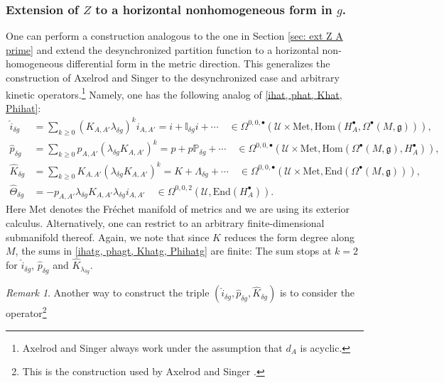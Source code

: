 \documentclass[11pt,a4paper]{amsart}
\theoremstyle{plain} %
\theoremstyle{definition}
\theoremstyle{remark}
\newtheorem{rem}[thm]{Remark}
\newcommand{\g}{\mathfrak{g}}
\newcommand{\mr}{\mathrm}
\newcommand{\bt}{\bullet}
\newcommand{\wh}{\widehat}
\newcommand{\mc}{\mathcal}
\begin{document}
{\subsubsection{Extension of $Z$ to a horizontal nonhomogeneous form in $g$.}
\label{sss Zhat g}
One can perform a construction analogous to the one in Section \ref{sec: ext Z A prime} and extend the desynchronized partition function to a horizontal non-homogeneous differential form in the metric direction. This generalizes the construction of Axelrod and Singer \cite{Axelrod1994} to the desynchronized case and arbitrary kinetic operators.\footnote{Axelrod and Singer always work under the assumption that $d_A$ is acyclic.} Namely, one has the following analog of \eqref{ihat, phat, Khat, Phihat}: 
\begin{equation}\label{ihatg, phagt, Khatg, Phihatg}
\begin{aligned}
    \wh{i}_{\delta g}&=\sum_{k\geq 0} (K_{A,A'}\lambda_{\delta g})^k i_{A,A'}=i+\mathbb{I}_{\delta g}i+\cdots \quad \in \Omega^{0,0,\bt}(\mc{U}\times \mr{Met},\mr{Hom}(H_A^\bt,\Omega^\bt(M,\g))), \\
    \wh{p}_{\delta g}&= \sum_{k\geq 0} p_{A,A'}(\lambda_{\delta g} K_{A,A'})^k=p+p\mathbb{P}_{\delta g}+\cdots\quad \in \Omega^{0,0,\bt}(\mc{U}\times \mr{Met},\mr{Hom}(\Omega^\bt(M,\g),H_A^\bt)), \\
     \wh{K}_{\delta g}&= \sum_{k\geq 0} K_{A,A'}(\lambda_{\delta g} K_{A,A'})^k=K+\Lambda_{\delta g}+\cdots\quad \in \Omega^{0,0,\bt}(\mc{U}\times \mr{Met},\mr{End}(\Omega^\bt(M,\g))),\\
     \wh\Theta_{\delta g}&=-p_{A,A'}\lambda_{\delta g} K_{A,A'}\lambda_{\delta g} i_{A,A'}\quad  \in \Omega^{0,0,2}(\mc{U},\mr{End}(H^\bt_A)).
\end{aligned}
\end{equation}
Here $\mr{Met}$ denotes the Fr\'echet manifold of metrics and we are using its exterior calculus. Alternatively, one can restrict to an arbitrary finite-dimensional submanifold thereof.
Again, we note that since $K$ reduces the form degree along $M$, the sums in \eqref{ihatg, phagt, Khatg, Phihatg} are finite: The sum stops at $k=2$ for $\wh{i}_{\delta g}$, $\wh{p}_{\delta g}$ and  $\wh{K}_{\lambda_{\delta g}}$. %
\begin{rem} 
Another way to construct the triple $(\wh{i}_{\delta g},\wh{p}_{\delta g},\wh{K}_{\delta g})$ is to consider the operator\footnote{This is the construction used by Axelrod and Singer \cite{Axelrod1994}.} 

\end{rem}}
\end{document}
